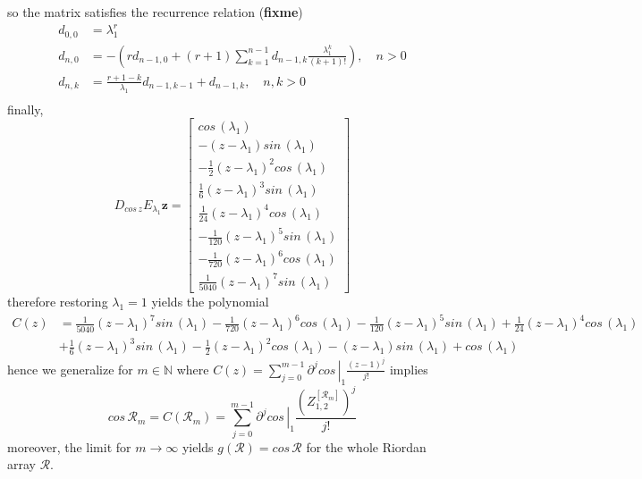 so the matrix satisfies the recurrence relation (\textbf{fixme})
\begin{displaymath}
\begin{split}
d_{0,0}&=\lambda_{1}^{r}\\
d_{n,0}&=-\left(r d_{n-1, 0} + (r+1)\sum_{k=1}^{n-1}{d_{n-1, k}\frac{\lambda_{1}^{k}}{(k+1)!}}\right), \quad n>0 \\
d_{n,k}&=\frac{r+1-k}{\lambda_{1}}d_{n-1, k-1} + d_{n-1,k}, \quad n,k > 0\\
\end{split}
\end{displaymath}
finally,
\begin{displaymath}
D_{cos\,{z}}E_{\lambda_{1}}\boldsymbol{z} = \left[\begin{matrix}cos\,{\left (\lambda_{1} \right )}\\- \left(z - \lambda_{1}\right) sin\,{\left (\lambda_{1} \right )}\\- \frac{1}{2} \left(z - \lambda_{1}\right)^{2} cos\,{\left (\lambda_{1} \right )}\\\frac{1}{6} \left(z - \lambda_{1}\right)^{3} sin\,{\left (\lambda_{1} \right )}\\\frac{1}{24} \left(z - \lambda_{1}\right)^{4} cos\,{\left (\lambda_{1} \right )}\\- \frac{1}{120} \left(z - \lambda_{1}\right)^{5} sin\,{\left (\lambda_{1} \right )}\\- \frac{1}{720} \left(z - \lambda_{1}\right)^{6} cos\,{\left (\lambda_{1} \right )}\\\frac{1}{5040} \left(z - \lambda_{1}\right)^{7} sin\,{\left (\lambda_{1} \right )}\end{matrix}\right]
\end{displaymath}
therefore restoring $\lambda_{1}=1$ yields the polynomial
\begin{displaymath}
\begin{split}
C{\left (z \right )} &= \frac{1}{5040} \left(z - \lambda_{1}\right)^{7} sin\,{\left (\lambda_{1} \right )} - \frac{1}{720} \left(z - \lambda_{1}\right)^{6} cos\,{\left (\lambda_{1} \right )} - \frac{1}{120} \left(z - \lambda_{1}\right)^{5} sin\,{\left (\lambda_{1} \right )} + \frac{1}{24} \left(z - \lambda_{1}\right)^{4} cos\,{\left (\lambda_{1} \right )} \\
                     &+ \frac{1}{6} \left(z - \lambda_{1}\right)^{3} sin\,{\left (\lambda_{1} \right )} - \frac{1}{2} \left(z - \lambda_{1}\right)^{2} cos\,{\left (\lambda_{1} \right )} - \left(z - \lambda_{1}\right) sin\,{\left (\lambda_{1} \right )} + cos\,{\left (\lambda_{1} \right )}
\end{split}
\end{displaymath}
hence we generalize for $m\in\mathbb{N}$ where $C(z) = \sum_{j=0}^{m-1}{\left.{\partial^{j} cos\,}\right|_{1} \frac{(z-1)^{j}}{j!}}$ implies
\begin{displaymath}
cos\,{\mathcal{R}_{m}} = C{\left (\mathcal{R}_{m} \right )} = \sum_{j=0}^{m-1}{\left.{\partial^{j} cos\,}\right|_{1} \frac{{\left(Z_{1,2}^{\left[\mathcal{R}_{m}\right]}\right)}^{j}}{j!}}
\end{displaymath}
moreover, the limit for $m \rightarrow \infty$ yields $ g{\left (\mathcal{R}
\right )} = cos\,{\mathcal{R}} $ for the whole Riordan array $\mathcal{R}$.
\fi
